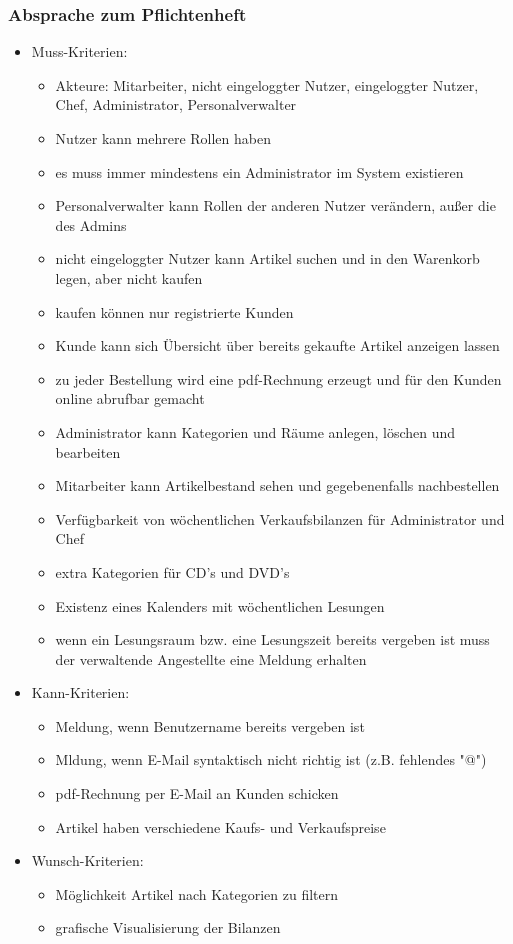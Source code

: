 \documentclass[12pt,a4paper]{article}
\begin{document}
\subsubsection*{Absprache zum Pflichtenheft}
\begin{itemize}
\item Muss-Kriterien:
\begin{itemize}
\item Akteure: Mitarbeiter, nicht eingeloggter Nutzer, eingeloggter Nutzer, Chef, Administrator, Personalverwalter
\item Nutzer kann mehrere Rollen haben
\item es muss immer mindestens ein Administrator im System existieren
\item Personalverwalter kann Rollen der anderen Nutzer verändern, außer die des Admins
\item nicht eingeloggter Nutzer kann Artikel suchen und in den Warenkorb legen, aber nicht kaufen
\item kaufen können nur registrierte Kunden
\item Kunde kann sich Übersicht über bereits gekaufte Artikel anzeigen lassen
\item zu jeder Bestellung wird eine pdf-Rechnung erzeugt und für den Kunden online abrufbar gemacht
\item Administrator kann Kategorien und Räume anlegen, löschen und bearbeiten
\item Mitarbeiter kann Artikelbestand sehen und gegebenenfalls nachbestellen
\item Verfügbarkeit von wöchentlichen Verkaufsbilanzen für Administrator und Chef
\item extra Kategorien für CD's und DVD's
\item Existenz eines Kalenders mit wöchentlichen Lesungen
\item wenn ein Lesungsraum bzw. eine Lesungszeit bereits vergeben ist muss der verwaltende Angestellte eine Meldung erhalten
\end{itemize}
\item Kann-Kriterien:
\begin{itemize}
\item Meldung, wenn Benutzername bereits vergeben ist
\item Mldung, wenn E-Mail syntaktisch nicht richtig ist (z.B. fehlendes "@")
\item pdf-Rechnung per E-Mail an Kunden schicken
\item Artikel haben verschiedene Kaufs- und Verkaufspreise
\end{itemize}
\item Wunsch-Kriterien:
\begin{itemize}
\item Möglichkeit Artikel nach Kategorien zu filtern
\item grafische Visualisierung der Bilanzen
\end{itemize}
\end{itemize}
\end{document}
